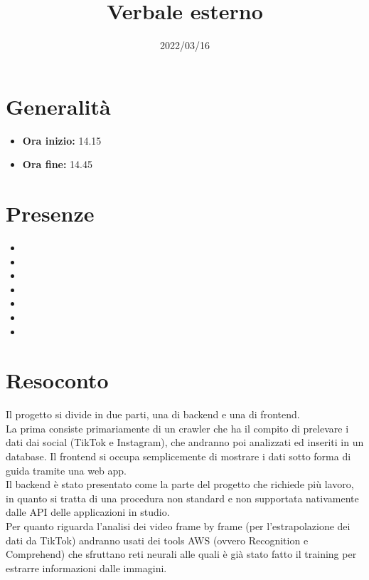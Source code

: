 \documentclass{classes/base}
\title{Verbale esterno}
\date{2022/03/16}
\author{\marcob}
\renewcommand{\maketitle}{
    
}
\begin{document}
    \maketitle

    \section*{Generalità}
    \begin{itemize}
        \item \textbf{Ora inizio:} 14.15
        \item \textbf{Ora fine:} 14.45
    \end{itemize}

    \section*{Presenze}
    \begin{itemize}
        \item \ruth
        \item \angela
        \item \marcov
        \item \giulio
        \item \marcob
        \item \matteo
        \item \tommaso
    \end{itemize}

    \section*{Resoconto}
    Il progetto si divide in due parti, una di backend e una di frontend.\\
    La prima consiste primariamente di un crawler che ha il compito di prelevare i dati dai social (TikTok e Instagram), che andranno poi analizzati ed inseriti in un database.
    Il frontend si occupa semplicemente di mostrare i dati sotto forma di guida tramite una web app.\\
    Il backend è stato presentato come la parte del progetto che richiede più lavoro, in quanto si tratta di una procedura non standard e non supportata nativamente dalle API delle applicazioni in studio.\\
    Per quanto riguarda l'analisi dei video frame by frame (per l'estrapolazione dei dati da TikTok) andranno usati dei tools AWS (ovvero Recognition e Comprehend) che sfruttano reti neurali alle quali è già stato fatto il training per estrarre informazioni dalle immagini.
\end{document}
